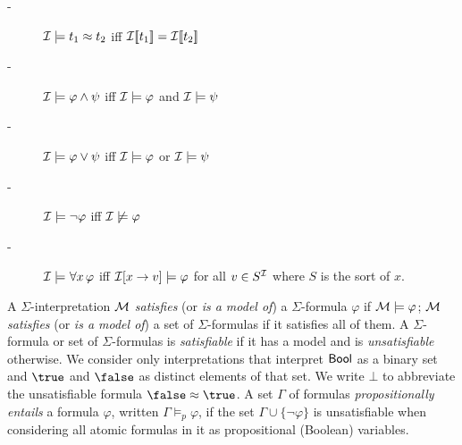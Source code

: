 \documentclass{svjour3}                     %
\begin{document}
\begin{description}
\item[-] $\mathcal{I} \models t_1 \approx t_2$ iff $\mathcal{I} [ \negthinspace [ t_1 ] \negthinspace ] = \mathcal{I} [ \negthinspace [ t_2 ] \negthinspace ]$
\item[-] $\mathcal{I} \models \varphi \wedge \psi$ iff $\mathcal{I} \models \varphi$ and $\mathcal{I} \models \psi$
\item[-] $\mathcal{I} \models \varphi \vee \psi$ iff $\mathcal{I} \models \varphi$ or $\mathcal{I} \models \psi$
\item[-] $\mathcal{I} \models \neg \varphi$ iff $\mathcal{I} \not\models \varphi$
\item[-] $\mathcal{I} \models_{} \forall x\, \varphi$ iff $\mathcal{I}[x \rightarrow v] \models \varphi$ for all $v \in S^{\mathcal{I}}$ where $S$ is the sort of $x$.
\end{description}
A $\Sigma$-interpretation $\mathcal{M}$ \emph{satisfies} (or \emph{is a model of}) 
a $\Sigma$-formula $\varphi$ if $\mathcal{M} \models \varphi$;
$\mathcal{M}$ \emph{satisfies} (or \emph{is a model of}) 
a set of $\Sigma$-formulas if it satisfies all of them.
A $\Sigma$-formula or set of $\Sigma$-formulas is \emph{satisfiable} if it has a model
and is \emph{unsatisfiable} otherwise.
We consider only interpretations that interpret $\mathsf{Bool}$ as a binary set and 
$\true$ and $\false$ as distinct elements of that set.
We write $\bot$ to abbreviate the unsatisfiable formula $\false \teq \true$.
A set $\Gamma$ of formulas \emph{propositionally entails} a formula $\varphi$, 
written $\Gamma \models_p \varphi$, if the set $\Gamma \cup \{\lnot \varphi\}$ is unsatisfiable
when considering all atomic formulas in it as propositional (Boolean) variables.
\end{document}
